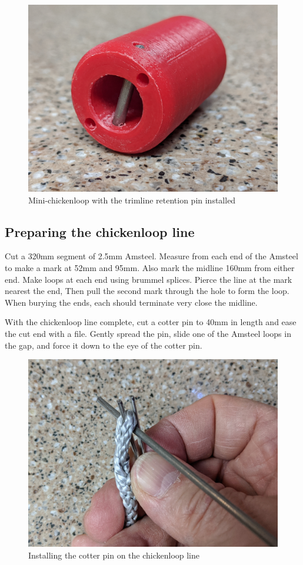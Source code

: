 \documentclass[
]{book}
\begin{document}
\begin{figure}

{\centering \includegraphics[width=0.7\linewidth]{images/chickenloop_release_with_pin} 

}

\caption{Mini-chickenloop with the trimline retention pin installed}\label{fig:chickenloop-release-with-pin}
\end{figure}

\hypertarget{preparing-the-chickenloop-line}{%
\subsection{Preparing the chickenloop line}\label{preparing-the-chickenloop-line}}

Cut a 320mm segment of 2.5mm Amsteel. Measure from each end of the Amsteel to make a mark at 52mm and 95mm. Also mark the midline 160mm from either end. Make loops at each end using brummel splices. Pierce the line at the mark nearest the end, Then pull the second mark through the hole to form the loop. When burying the ends, each should terminate very close the midline.

With the chickenloop line complete, cut a cotter pin to 40mm in length and ease the cut end with a file. Gently spread the pin, slide one of the Amsteel loops in the gap, and force it down to the eye of the cotter pin.

\begin{figure}

{\centering \includegraphics[width=0.7\linewidth]{images/install_the_cotter_pin} 

}

\caption{Installing the cotter pin on the chickenloop line}\label{fig:install-the-cotter-pin}
\end{figure}
\end{document}
